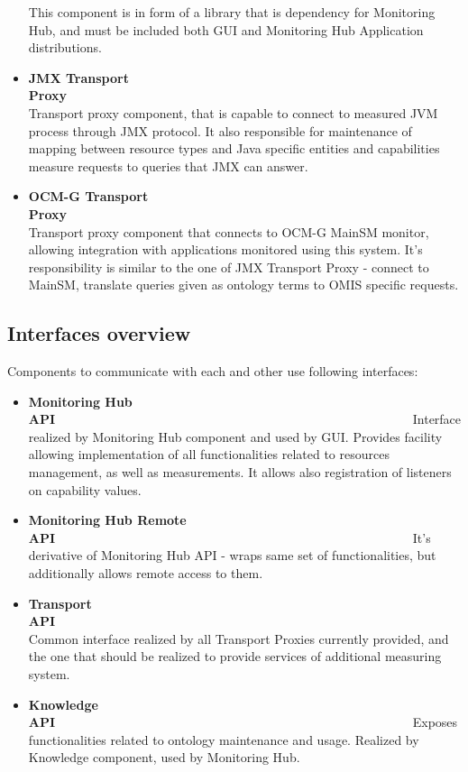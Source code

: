 \begin{itemize}
This component is in form of a library that is dependency for Monitoring Hub, and must be included both GUI and
Monitoring Hub Application distributions.


 \item {\bf JMX Transport Proxy}~~~~~~~~~~~~~~~~~~~~~~~~~~~~~~~~~~~~~~~~~~~~~~~~~~~~~~~~\linebreak
Transport proxy component, that is capable to connect to measured JVM process through JMX protocol. It also responsible
for maintenance of mapping between resource types and Java specific entities and capabilities measure requests to
queries that JMX can answer.

 \item {\bf OCM-G Transport Proxy}~~~~~~~~~~~~~~~~~~~~~~~~~~~~~~~~~~~~~~~~~~~~~~~~~~~~~~~~\linebreak
Transport proxy component that connects to OCM-G MainSM monitor, allowing integration with applications monitored
using this system. It's responsibility is similar to the one of JMX Transport Proxy - connect to MainSM, translate
queries given as ontology terms to OMIS specific requests.

\end{itemize}


\subsection{Interfaces overview}

Components to communicate with each and other use following interfaces:

\begin{itemize}
 \item {\bf Monitoring Hub API}~~~~~~~~~~~~~~~~~~~~~~~~~~~~~~~~~~~~~~~~~~~~~~~~~~~~~~~~\linebreak
Interface realized by Monitoring Hub component and used by GUI. Provides facility allowing implementation of all
functionalities related to resources management, as well as measurements. It allows also registration of listeners on
capability values.

 \item {\bf Monitoring Hub Remote API}~~~~~~~~~~~~~~~~~~~~~~~~~~~~~~~~~~~~~~~~~~~~~~~~~~~~~~~~\linebreak
It's derivative of Monitoring Hub API - wraps same set of functionalities, but additionally allows remote access to
them.

 \item {\bf Transport API}~~~~~~~~~~~~~~~~~~~~~~~~~~~~~~~~~~~~~~~~~~~~~~~~~~~~~~~~\linebreak
Common interface realized by all Transport Proxies currently provided, and the one that should be realized to provide
services of additional measuring system.

 \item {\bf Knowledge API}~~~~~~~~~~~~~~~~~~~~~~~~~~~~~~~~~~~~~~~~~~~~~~~~~~~~~~~~\linebreak
Exposes functionalities related to ontology maintenance and usage. Realized by Knowledge component, used by Monitoring
Hub. 
\end{itemize}

